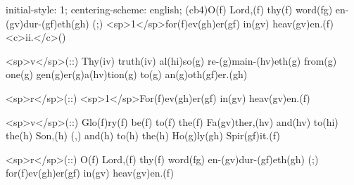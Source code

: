 initial-style: 1;
centering-scheme: english;
(cb4)O(f) Lord,(f) thy(f) word(fg) en-(gv)dur-(gf)eth(gh) (;) <sp>1</sp>for(f)ev(gh)er(gf) in(gv) heav(gv)en.(f) <c>ii.</c>()

<sp>v</sp>(::) Thy(iv) truth(iv) al(hi)so(g) re-(g)main-(hv)eth(g) from(g) one(g) gen(g)er(g)a(hv)tion(g) to(g) an(g)oth(gf)er.(gh)

<sp>r</sp>(::) <sp>1</sp>For(f)ev(gh)er(gf) in(gv) heav(gv)en.(f)

<sp>v</sp>(::) Glo(f)ry(f) be(f) to(f) the(f) Fa(gv)ther,(hv) and(hv) to(hi) the(h) Son,(h) (,) and(h) to(h) the(h) Ho(g)ly(gh) Spir(gf)it.(f)

<sp>r</sp>(::) O(f) Lord,(f) thy(f) word(fg) en-(gv)dur-(gf)eth(gh) (;) for(f)ev(gh)er(gf) in(gv) heav(gv)en.(f)